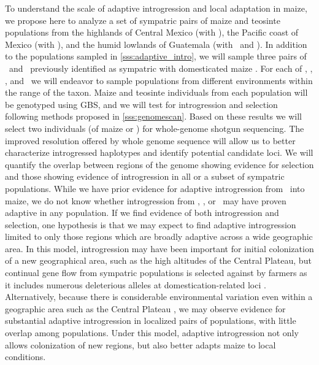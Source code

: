To understand the scale of adaptive introgression and local adaptation in maize, we propose here to analyze a set of sympatric pairs of maize and teosinte populations from the highlands of Central Mexico (with \zm), the Pacific coast of Mexico (with \zp), and the humid lowlands of Guatemala (with \zl\ and \zh). 
In addition to the populations sampled in \ref{sss:adaptive_intro}, we will sample three pairs of \zm\ and \zp\ previously identified as sympatric with domesticated maize \citep{hufford2010genetic, Hufford2013}.  
For each of \zl, \zm, \zp, and \zh\ we will endeavor to sample populations from different environments within the range of the taxon.
Maize and teosinte individuals from each population will be genotyped using GBS, and we will test for introgression and selection following methods proposed in \ref{sss:genomescan}.
Based on these results we will select two individuals (of maize or \zm) for whole-genome shotgun sequencing. 
The improved resolution offered by whole genome sequence will allow us to better characterize introgressed haplotypes and identify potential candidate loci.
We will quantify the overlap between regions of the genome showing evidence for selection and those showing evidence of introgression in all or a subset of sympatric populations.  
While we have prior evidence for adaptive introgression from \zm\ into maize, we do not know whether introgression from \zp, \zl, or \zh\ may have proven adaptive in any population.
If we find evidence of both introgression and selection, one hypothesis is that we may expect to find adaptive introgression limited to only those regions which are broadly adaptive across a wide geographic area. 
In this model, introgression may have been important for initial colonization of a new geographical area, such as the high altitudes of the Central Plateau, but continual gene flow from sympatric populations is selected against by farmers as it includes numerous deleterious alleles at domestication-related loci \citep[c.f.][]{Hufford2013}.
Alternatively, because there is considerable environmental variation even within a geographic area such as the Central Plateau \citep{hufford2012inferences, Pyhajarvi2013}, we may observe evidence for substantial adaptive introgression in localized pairs of populations, with little overlap among populations. 
Under this model, adaptive introgression not only allows colonization of new regions, but also better adapts maize to local conditions.

